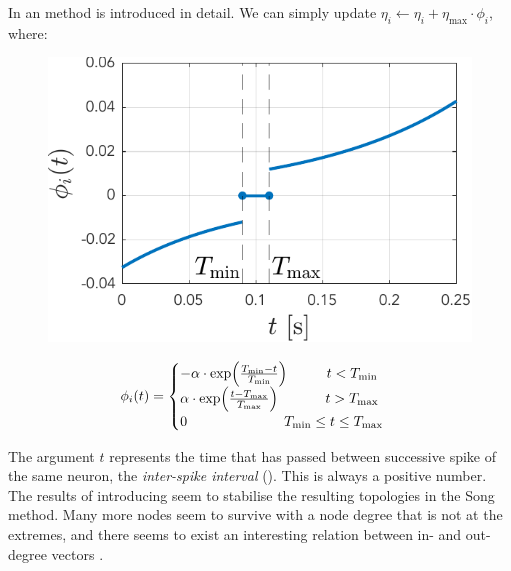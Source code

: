 In \cite{Song2017} an \IP method is introduced in detail. We can simply update $\eta_{i} \leftarrow \eta_{i} + \eta_{\max } \cdot \phi_{i}$, where: 
\begin{minipage}{.45\textwidth}
   \centering
   \begin{figure}[H]
	\centering
	\includegraphics[width = \textwidth]{../Figures/Learning/IPlearningFunction.pdf}
	\label{fig:IPlearningFunction}
	\end{figure}
\end{minipage}
\begin{minipage}{.55\textwidth}
\begin{align}
	\phi_{i} (t) =
	\begin{cases}
	-\alpha \cdot \exp \left(\frac{T_{\min }-t}{T_{\rm min }}\right) \hspace{10mm} t<T_{ \rm min } \\ 
	\alpha \cdot \exp \left(\frac{t-T_{\rm max }}{T_{\max }}\right) \hspace{12mm} t >T_{\rm max } \\ 
	0 \hspace{24.5mm} T_{ \rm min } \leq t \leq T_{\rm max }
	\end{cases}
\end{align}
\vspace{10mm}
\end{minipage}
The argument $t$ represents the time that has passed between successive spike of the same neuron, the \textsl{inter-spike interval} (\ISI). This is always a positive number. \\

The results of introducing \IP seem to stabilise the resulting topologies in the Song method. Many more nodes seem to survive with a node degree that is not at the extremes, and there seems to exist an interesting relation between in- and out-degree vectors \cite{Song2017}.



